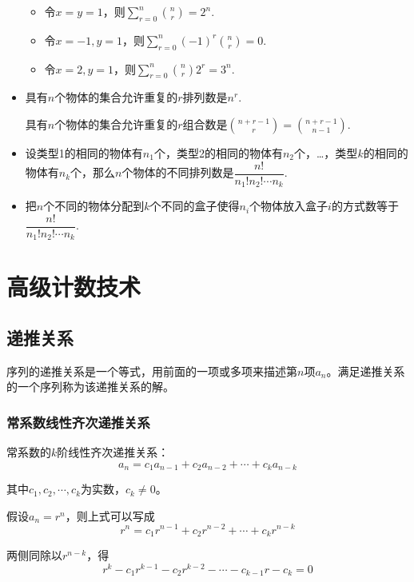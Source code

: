 \begin{itemize}
    \begin{itemize}
        \item 令$x = y = 1$，则$\displaystyle \sum_{r=0}^n \binom{n}{r} = 2^n$.
        \item 令$x =-1, y = 1$，则$\displaystyle \sum_{r=0}^n (-1)^r \binom{n}{r} = 0$.
        \item 令$x = 2, y = 1$，则$\displaystyle \sum_{r=0}^n \binom{n}{r} 2^r= 3^n$.
    \end{itemize}

    \item 具有$n$个物体的集合允许重复的$r$排列数是$n^r$.

    具有$n$个物体的集合允许重复的$r$组合数是$\displaystyle \binom{n+r-1}{r} = \binom{n+r-1}{n-1}$.

    \item 设类型1的相同的物体有$n_1$个，类型2的相同的物体有$n_2$个，\ldots，类型$k$的相同的物体有$n_k$个，那么$n$个物体的不同排列数是$\dfrac {n!}{n_1! n_2! \cdots n_k}$.

    \item 把$n$个不同的物体分配到$k$个不同的盒子使得$n_i$个物体放入盒子$i$的方式数等于$\dfrac {n!}{n_1! n_2! \cdots n_k}$.
\end{itemize}

\section{高级计数技术}
\subsection{递推关系}
序列的递推关系是一个等式，用前面的一项或多项来描述第$n$项$a_n$。满足递推关系的一个序列称为该递推关系的解。

\subsubsection*{常系数线性齐次递推关系}
常系数的$k$阶线性齐次递推关系：
\[a_n = c_1 a_{n-1} + c_2 a_{n-2} + \cdots + c_k a_{n-k}\]

其中$c_1,c_2,\cdots,c_k$为实数，$c_k \neq 0$。

假设$a_n = r^n$，则上式可以写成
\[r^n = c_1 r^{n-1} + c_2 r^{n-2} + \cdots + c_k r^{n-k}\]

两侧同除以$r^{n-k}$，得
\[r^k - c_1 r^{k-1} - c_2 r^{k-2} - \cdots - c_{k-1} r - c_k = 0\]

